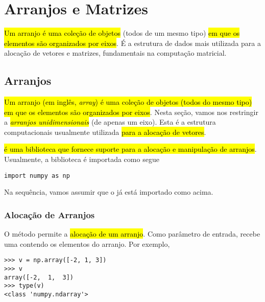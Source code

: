 
\chapter{Arranjos e Matrizes}\label{cap_arr}

\hl{Um arranjo é uma coleção de objetos} (todos de um mesmo tipo) \hl{em que os elementos são organizados por eixos}. É a estrutura de dados mais utilizada para a alocação de vetores e matrizes, fundamentais na computação matricial.

\section{Arranjos}\label{cap_arr_sec_arr}

\hl{Um arranjo (em inglês, \textit{array}) é uma coleção de objetos (todos do mesmo tipo) em que os elementos são organizados por eixos}. Nesta seção, vamos nos restringir a \hl{\emph{arranjos unidimensionais}} (de apenas um eixo). Esta é a estrutura computacionais usualmente utilizada \hl{para a alocação de vetores}.

\hl{{\numpy} é uma biblioteca {\python} que fornece suporte para a alocação e manipulação de arranjos}. Usualmente, a biblioteca é importada como segue

\begin{lstlisting}
import numpy as np
\end{lstlisting}

Na sequência, vamos assumir que o {\numpy} já está importado como acima.

\subsection{Alocação de Arranjos}

O método {\PYTHONnumpyDOTarray} permite a \hl{alocação de um arranjo}. Como parâmetro de entrada, recebe uma {\PYTHONlist} contendo os elementos do arranjo. Por exemplo,

\begin{lstlisting}
>>> v = np.array([-2, 1, 3])
>>> v
array([-2,  1,  3])
>>> type(v)
<class 'numpy.ndarray'>
\end{lstlisting}

